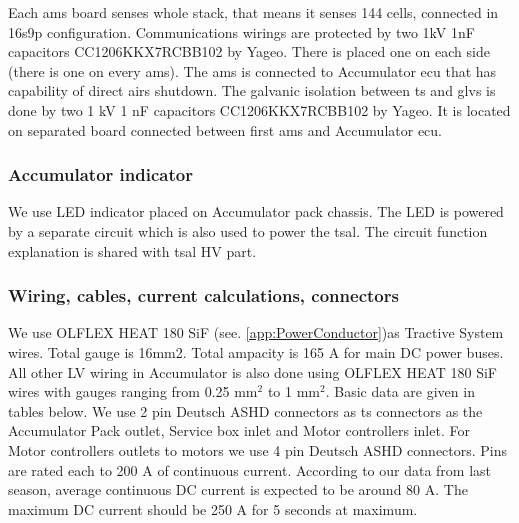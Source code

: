 Each \gls{ams} board senses whole stack, that means it senses 144 cells, connected in 16s9p configuration. Communications wirings are protected by two 1kV 1nF capacitors CC1206KKX7RCBB102 by Yageo. There is placed one on each side (there is one on every \gls{ams}). The \gls{ams} is connected to Accumulator \gls{ecu} that has capability of direct \glspl{air} shutdown. The galvanic isolation between \gls{ts} and \gls{glvs} is done by two 1 kV 1 nF capacitors CC1206KKX7RCBB102 by Yageo. It is located on separated board connected between first \gls{ams} and Accumulator \gls{ecu}.




\subsubsection{Accumulator indicator}

We use LED indicator placed on Accumulator pack chassis. The LED is powered by a separate circuit which is also used to power the \gls{tsal}. The circuit function explanation is shared with \gls{tsal} HV part. 

\subsubsection{Wiring, cables, current calculations, connectors}\label{subsec:acp_wiring}


We use OLFLEX HEAT 180 SiF (see. \ref{app:PowerConductor})as Tractive System wires. Total gauge is 16mm2. Total ampacity is 165 A for main DC power buses. All other LV wiring in Accumulator is also done using OLFLEX HEAT 180 SiF wires with gauges ranging from 0.25 mm$^2$ to 1 mm$^2$. Basic data are given in tables below. We use 2 pin Deutsch ASHD connectors as \gls{ts} connectors as the Accumulator Pack outlet, Service box inlet and Motor controllers inlet. For Motor controllers outlets to motors we use 4 pin Deutsch ASHD connectors. Pins are rated each to 200 A of continuous current. According to our data from last season, average continuous DC current is expected to be around 80 A. The maximum DC current should be 250 A for 5 seconds at maximum.


